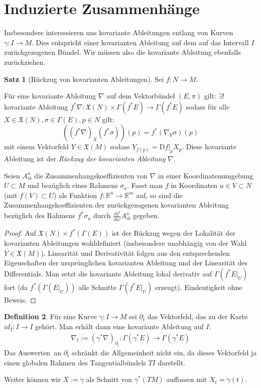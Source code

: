 \documentclass[a4paper]{scrbook}
\numberwithin{equation}{chapter}
\newcommand{\DD}{\mathrm{D}}
\newcommand{\R}{\mathbb{R}}
\newcommand{\vf}{\mathfrak{X}}
\theoremstyle{definition}
\newtheorem{defn}{Definition}[section]
\newtheorem{satz}[defn]{Satz}
\begin{document}
	\section{Induzierte Zusammenhänge}
		Insbesondere interessieren uns kovariante Ableitungen entlang von Kurven $\gamma\colon I\rightarrow M$. Dies entspricht einer kovarianten Ableitung auf dem auf das Intervall $I$ zurückgezogenen Bündel. Wir müssen also die kovariante Ableitung ebenfalls zurückziehen.
		\begin{satz}[Rückzug von kovarianten Ableitungen]
			Sei $f\colon N\rightarrow M$.
			
			Für eine kovariante Ableitung $\nabla$ auf dem Vektorbündel $(E,\pi)$ gilt: $\exists!$ kovariante Ableitung $f^*\nabla\colon\vf(N)\times\Gamma(f^*E)\rightarrow \Gamma(f^*E)$ sodass für alle $X\in\vf(N),\sigma\in\Gamma(E), {p \in N}$ gilt:
			\begin{equation*}
				\left(\left(f^*\nabla\right)_X(f^*\sigma)\right)(p)=f^*\left(\nabla_Y\sigma\right)(p)
			\end{equation*}
			mit einem Vektorfeld $Y\in\vf(M)$ sodass $Y_{f(p)}=\DD f\vert_p X_p$. Diese kovariante Ableitung ist der \emph{Rückzug der kovarianten Ableitung} $\nabla$.
			
			Seien $A_{ib}^a$ die Zusammenhangskoeffizienten von $\nabla$ in einer Koordinatenumgebung $U\subset M$ und bezüglich eines Rahmens $\sigma_a$.
			Fasst man $f$ in Koordinaten $u\in V\subset N$ (mit $f(V)\subset U$) als Funktion $f\colon\R^n\rightarrow\R^m$ auf, so sind die Zusammenhangskoeffizienten der zurückgezogenen kovarianten Ableitung bezüglich des Rahmens $f^*\sigma_a$ durch $\frac{\partial f^i}{\partial u^j}A_{ib}^a$ gegeben.
			\begin{proof}
				Auf $\vf(N)\times f^*(\Gamma(E))$ ist der Rückzug wegen der Lokalität der kovarianten Ableitungen wohldefiniert (insbesondere unabhängig von der Wahl $Y\in\vf(M)$). Linearität und Derivativität folgen aus den entsprechenden Eigenschaften der ursprünglichen kovarianten Ableitung und der Linearität des Differentials. Man setzt die kovariante Ableitung lokal derivativ auf $\Gamma(f^*E\vert_U)$ fort (da $f^*(\Gamma(E\vert_U))$ alle Schnitte $\Gamma(f^*E\vert_U)$ erzeugt). Eindeutigkeit ohne Beweis.
			\end{proof}
		\end{satz}
		\begin{defn}
			Für eine Kurve $\gamma\colon I\rightarrow M$ sei $\partial_t$ das Vektorfeld, das zu der Karte $id_I\colon I\rightarrow I$ gehört. Man erhält dann eine kovariante Ableitung auf $I$:
			\begin{align*}
				\nabla_t:=(\gamma^*\nabla)_{\partial_t}\colon\Gamma(\gamma^*E)\rightarrow\Gamma(\gamma^*E)
			\end{align*}
			Das \glqq Auswerten\grqq\ an $\partial_t$ schränkt die Allgemeinheit nicht ein, da dieses Vektorfeld ja einen globalen Rahmen des Tangentialbündels $TI$ darstellt.
			
			Weiter können wir $X:=\dot{\gamma}$ als Schnitt von $\gamma^*(TM)$ auffassen mit $X_t=\dot{\gamma}(t)$.  
		\end{defn}
\end{document}
